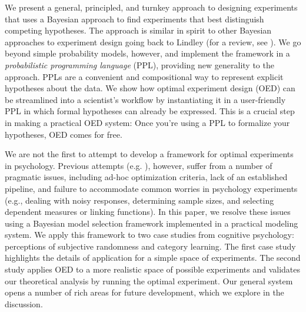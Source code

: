 \documentclass{article}
\newcommand{\lou}[1]{\textcolor{orange}{[lou: #1]}}
\begin{document}
We present a general, principled, and turnkey approach to designing experiments that uses a Bayesian approach to find experiments that best distinguish competing hypotheses.
The approach is similar in spirit to other Bayesian approaches to experiment design going back to Lindley \cite{Lindley1956} (for a review, see \cite{Chaloner1995}).
We go beyond simple probability models, however, and implement the framework  in a \emph{probabilistic programming language} (PPL), providing new generality to the approach.
PPLs are a convenient and compositional way to represent explicit hypotheses about the data.
We show how optimal experiment design (OED) can be streamlined into a scientist's workflow by instantiating it in a user-friendly PPL in which formal hypotheses can already be expressed.
This is a crucial step in making a practical OED system: Once you're using a PPL to formalize your hypotheses, OED comes for free.


We are not the first to attempt to develop a framework for optimal experiments in psychology.
Previous attempts (e.g. \cite{Myung2009}), however, suffer from a number of pragmatic issues, including ad-hoc optimization criteria, lack of an established pipeline, and failure to accommodate common worries in psychology experiments (e.g., dealing with noisy responses, determining sample sizes, and selecting dependent measures or linking functions).
In this paper, we resolve these issues using a Bayesian model selection framework implemented in a practical modeling system.
We apply this framework to two case studies from cognitive psychology: perceptions of subjective randomness and category learning.
The first case study highlights the details of application for a simple space of experiments.
The second study applies OED to a more realistic space of possible experiments and validates our theoretical analysis by running the optimal experiment.
Our general system opens a number of rich areas for future development, which we explore in the discussion.
\end{document}
